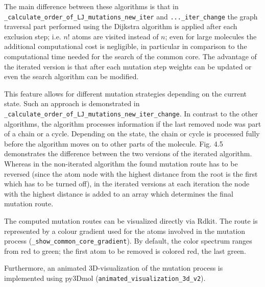The main difference between these algorithms is that in \texttt{\_calculate\_order\_of\_LJ\_mutations\_new\_iter}
and \texttt{...\_iter\_change} the graph traversal part performed
using the Dijkstra algorithm is applied after each exclusion step; i.e. $n!$ atoms are visited instead of $n$; even for large molecules the additional computational cost is negligible, in particular in comparison
to the computational time needed for the search of the common core.
The advantage of the iterated version is that after each mutation step weights can be
updated or even the search algorithm can be modified. 

This feature allows for different mutation strategies depending
on the current state. Such an approach is demonstrated in \texttt{\_calculate\_order\_of\_LJ\_mutations\_new\_iter\_change}.
In contrast to the other algorithms, the algorithm processes information
if the last removed node was part of a chain or a cycle. Depending
on the state, the chain or cycle is processed fully before the algorithm
moves on to other parts of the molecule. Fig. 4.5 demonstrates the difference between the two versions of the iterated algorithm.
Whereas in the non-iterated algorithm the found mutation route has to be reversed (since the atom node with the highest distance from the root is the first which has to be turned off), in the iterated versions at each iteration the node with the highest distance is added to an array which determines the final mutation route.

The computed mutation routes can be visualized directly via Rdkit. 
The route is represented by a colour gradient used for the atoms involved
in the mutation process (\texttt{\_show\_common\_core\_gradient}). By default, the color spectrum ranges from red to green; the first atom to be removed is colored red, the last green.

Furthermore, an animated 3D-visualization of the mutation process
is implemented using py3Dmol (\texttt{animated\_visualization\_3d\_v2})\cite{key-4}. 

